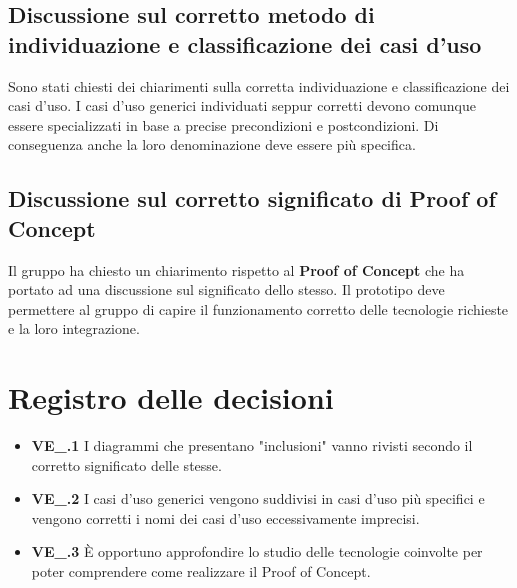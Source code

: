 \subsection{Discussione sul corretto metodo di individuazione e classificazione dei casi d'uso}
Sono stati chiesti dei chiarimenti sulla corretta individuazione e classificazione dei casi d'uso. I casi d'uso generici individuati seppur corretti devono comunque essere specializzati in base a precise precondizioni e postcondizioni. Di conseguenza anche la loro denominazione deve essere più specifica.
\subsection{Discussione sul corretto significato di Proof of Concept}
Il gruppo ha chiesto un chiarimento rispetto al \textbf{Proof of Concept} che ha portato ad una discussione sul significato dello stesso. Il prototipo deve permettere al gruppo di capire il funzionamento corretto delle tecnologie richieste e la loro integrazione.

\section{Registro delle decisioni}
\begin{itemize}
  \item \textbf{VE\_\Data.1} I diagrammi che presentano "inclusioni" vanno rivisti secondo il corretto significato delle stesse.
   \item \textbf{VE\_\Data.2} I casi d'uso generici vengono suddivisi in casi d'uso più specifici e vengono corretti i nomi dei casi d'uso eccessivamente imprecisi.
   \item \textbf{VE\_\Data.3} È opportuno approfondire lo studio delle tecnologie coinvolte per poter comprendere come realizzare il Proof of Concept.
\end{itemize}